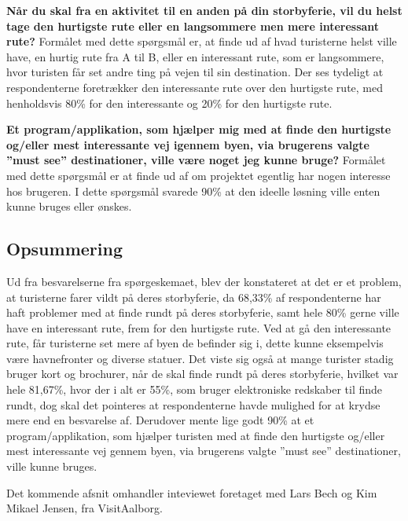 \textbf{Når du skal fra en aktivitet til en anden på din storbyferie, vil du helst tage den hurtigste rute eller en langsommere men mere interessant rute?}\newline 
Formålet med dette spørgsmål er, at finde ud af hvad turisterne helst ville have, en hurtig rute fra A til B, eller en interessant rute, som er langsommere, hvor turisten får set andre ting på vejen til sin destination.\newline
Der ses tydeligt at respondenterne foretrækker den interessante rute over den hurtigste rute, med henholdsvis 80\% for den interessante og 20\% for den hurtigste rute. \newline

\textbf{Et program/applikation, som hjælper mig med at finde den hurtigste og/eller mest interessante vej igennem byen, via brugerens valgte ”must see” destinationer, ville være noget jeg kunne bruge?}\newline
Formålet med dette spørgsmål er at finde ud af om projektet egentlig har nogen interesse hos brugeren.\newline  
I dette spørgsmål svarede 90\% at den ideelle løsning ville enten kunne bruges eller ønskes.\newline

\subsection{Opsummering}
Ud fra besvarelserne fra spørgeskemaet, blev der konstateret at det er et problem, at turisterne farer vildt på deres storbyferie, da 68,33\% af respondenterne har haft problemer med at finde rundt på deres storbyferie, samt hele 80\% gerne ville have en interessant rute, frem for den hurtigste rute. Ved at gå den interessante rute, får turisterne set mere af byen de befinder sig i, dette kunne eksempelvis være havnefronter og diverse statuer. Det viste sig også at mange turister stadig bruger kort og brochurer, når de skal finde rundt på deres storbyferie, hvilket var hele 81,67\%, hvor der i alt er 55\%, som bruger elektroniske redskaber til finde rundt, dog skal det pointeres at respondenterne havde mulighed for at krydse mere end en besvarelse af. Derudover mente lige godt 90\% at et program/applikation, som hjælper turisten med at finde den hurtigste og/eller mest interessante vej gennem byen, via brugerens valgte ”must see” destinationer, ville kunne bruges.

Det kommende afsnit omhandler inteviewet foretaget med Lars Bech og Kim Mikael Jensen, fra VisitAalborg.

